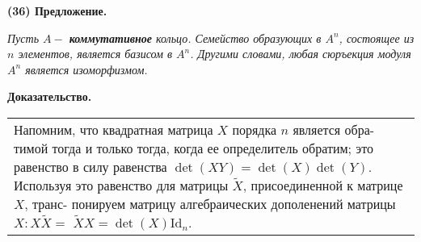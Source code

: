 	\noindent
	{\bf (36) Предложение.}
	
	{\it Пусть $A - $ {\bf коммутативное} кольцо. Семейство образующих в $A^n$,\linebreak
	состоящее из $n$ элементов, является базисом в $A^n$. Другими словами,\linebreak
	любая сюръекция модуля $A^n$ является изоморфизмом.}
	
	\noindent
	{\bf Доказательство.}
	
	\begin{tabular}{|p{13cm}}
	\noindent
	Напомним, что квадратная матрица $X$ порядка $n$ является обра-\linebreak
	тимой тогда и только тогда, когда ее определитель обратим; это\linebreak
	равенство в силу равенства $\det(XY) = \det(X)\det(Y)$. Используя это\linebreak
	равенство для матрицы $\widetilde{X}$, присоединенной к матрице $X$, транс-\linebreak
	понируем матрицу алгебраических дополенений матрицы $X: X\widetilde{X} = $\linebreak
	$\widetilde{X}X = \det(X) \text{Id}_n$.
	\end{tabular}
	
	\pagebreak
	
	
